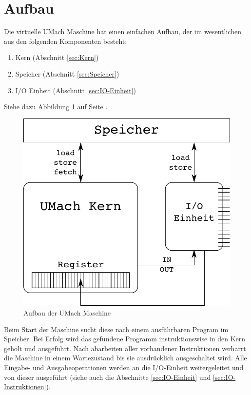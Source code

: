 \section{Aufbau}
\label{sec:Aufbau}

Die virtuelle UMach Maschine hat einen einfachen Aufbau, der im
wesentlichen aus den folgenden Komponenten besteht:
\begin{enumerate}
 \item Kern (Abschnitt \ref{sec:Kern})
 \item Speicher (Abschnitt \ref{sec:Speicher})
 \item I/O Einheit (Abschnitt \ref{sec:IO-Einheit})
\end{enumerate}

Siehe dazu Abbildung \ref{fig:umach-aufbau} auf Seite
\pageref{fig:umach-aufbau}.

\begin{figure}[htp]
 \centering
 \includegraphics{./img/UMach-Aufbau.pdf}
 \caption{Aufbau der UMach Maschine}
 \label{fig:umach-aufbau}
\end{figure}

Beim Start der Maschine sucht diese nach einem ausführbaren Program im Speicher.
Bei Erfolg wird das gefundene Programm instruktionswise in den Kern geholt und
ausgeführt. Nach abarbeiten aller vorhandener Instruktionen verharrt die
Maschine in einem Wartezustand bis sie ausdrücklich ausgeschaltet wird.
Alle Eingabe- und Ausgabeoperationen werden an die I/O-Einheit weitergeleitet
und von dieser ausgeführt (siehe auch die Abschnitte \ref{sec:IO-Einheit} und
\ref{sec:IO-Instruktionen}).




